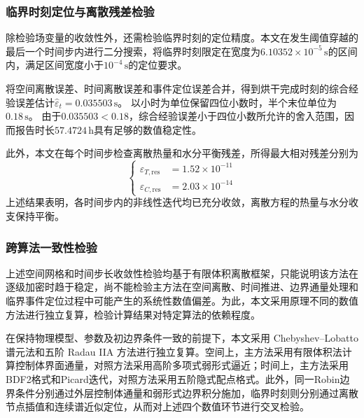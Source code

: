 \documentclass[withoutpreface,bwprint]{cumcmthesis}
\begin{document}
\subsubsection{临界时刻定位与离散残差检验}

除检验场变量的收敛性外，还需检验临界时刻的定位精度。本文在发生阈值穿越的最后一个时间步内进行二分搜索，将临界时刻限定在宽度为$6.10352\times10^{-5}\,\mathrm s$的区间内，满足区间宽度小于$10^{-4}\,\mathrm s$的定位要求。

将空间离散误差、时间离散误差和事件定位误差合并，得到烘干完成时刻的综合经验误差估计$\widehat\varepsilon_t=0.035503\,\mathrm s$。
以小时为单位保留四位小数时，半个末位单位为$0.18\,\mathrm s$。
由于$0.035503<0.18$，综合经验误差小于四位小数所允许的舍入范围，因而报告时长$57.4724\,\mathrm h$具有足够的数值稳定性。

此外，本文在每个时间步检查离散热量和水分平衡残差，所得最大相对残差分别为
\begin{equation}
\left\{
\begin{aligned}
\varepsilon_{T,\mathrm{res}}&=1.52\times10^{-11}\\
\varepsilon_{C,\mathrm{res}}&=2.03\times10^{-14}
\end{aligned}
\right.
\label{eq:q3-discrete-residuals}
\end{equation}
上述结果表明，各时间步内的非线性迭代均已充分收敛，离散方程的热量与水分收支保持平衡。

\subsubsection{跨算法一致性检验}

上述空间网格和时间步长收敛性检验均基于有限体积离散框架，只能说明该方法在逐级加密时趋于稳定，尚不能检验主方法在空间离散、时间推进、边界通量处理和临界事件定位过程中可能产生的系统性数值偏差。为此，本文采用原理不同的数值方法进行独立复算，检验计算结果对特定算法的依赖程度。

在保持物理模型、参数及初边界条件一致的前提下，本文采用 Chebyshev--Lobatto 谱元法\cite{trefethen2000}和五阶 Radau IIA 方法\cite{hairer1996}进行独立复算。空间上，主方法采用有限体积法计算控制体界面通量，对照方法采用高阶多项式弱形式逼近；时间上，主方法采用BDF2格式和Picard迭代，对照方法采用五阶隐式配点格式。此外，同一Robin边界条件分别通过外层控制体通量和弱形式边界积分施加，临界时刻则分别通过离散节点插值和连续谱近似定位，从而对上述四个数值环节进行交叉检验。
\end{document}
